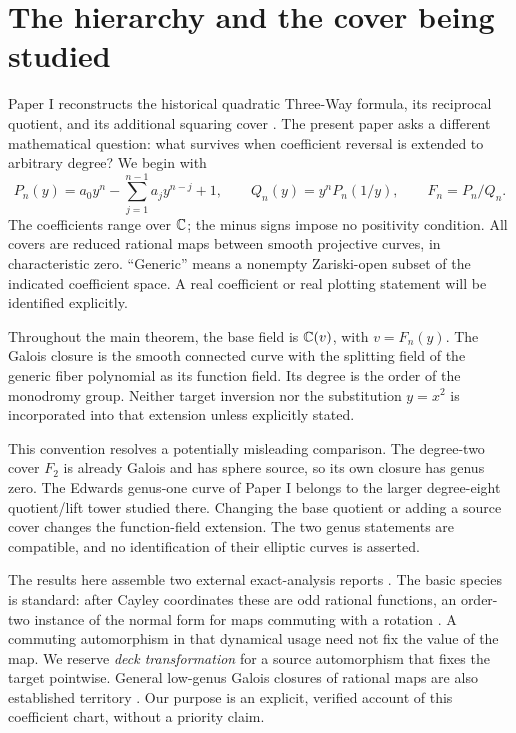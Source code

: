 \section{The hierarchy and the cover being studied}\label{sec:scope}
Paper I reconstructs the historical quadratic Three-Way formula, its reciprocal quotient, and its additional squaring cover \cite{paper1}. The present paper asks a different mathematical question: what survives when coefficient reversal is extended to arbitrary degree? We begin with
\begin{equation}\label{eq:family}
 P_n(y)=a_0y^n-\sum_{j=1}^{n-1}a_jy^{n-j}+1,
 \qquad Q_n(y)=y^nP_n(1/y),\qquad F_n=P_n/Q_n.
\end{equation}
The coefficients range over \(\mathbb C\); the minus signs impose no positivity condition. All covers are reduced rational maps between smooth projective curves, in characteristic zero. ``Generic'' means a nonempty Zariski-open subset of the indicated coefficient space. A real coefficient or real plotting statement will be identified explicitly.

Throughout the main theorem, the base field is \(\mathbb C(v)\), with \(v=F_n(y)\). The Galois closure is the smooth connected curve with the splitting field of the generic fiber polynomial as its function field. Its degree is the order of the monodromy group. Neither target inversion nor the substitution \(y=x^2\) is incorporated into that extension unless explicitly stated.

This convention resolves a potentially misleading comparison. The degree-two cover \(F_2\) is already Galois and has sphere source, so its own closure has genus zero. The Edwards genus-one curve of Paper I belongs to the larger degree-eight quotient/lift tower studied there. Changing the base quotient or adding a source cover changes the function-field extension. The two genus statements are compatible, and no identification of their elliptic curves is asserted.

The results here assemble two external exact-analysis reports \cite{hierarchy,cubic}. The basic species is standard: after Cayley coordinates these are odd rational functions, an order-two instance of the normal form for maps commuting with a rotation \cite[§2.1, Lemma 2]{msw}. A commuting automorphism in that dynamical usage need not fix the value of the map. We reserve \emph{deck transformation} for a source automorphism that fixes the target pointwise. General low-genus Galois closures of rational maps are also established territory \cite[§2 and Theorems 1.1--1.2]{pakovich}. Our purpose is an explicit, verified account of this coefficient chart, without a priority claim.


